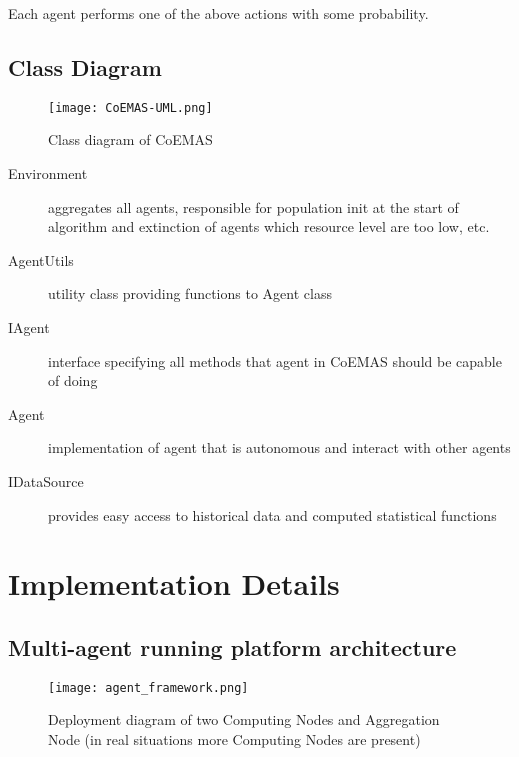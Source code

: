 Each agent performs one of the above actions with some probability.



\subsection{Class Diagram}
\label{CoEMAS-class-diagram}

\begin{figure}[H]   
	    \begin{center}
	      \texttt{[image: CoEMAS-UML.png]}
	    \end{center}
	    \caption{Class diagram of CoEMAS} 
	  \end{figure}

\begin{description}
  \item [Environment]
      aggregates all agents, responsible for population init at the start of algorithm and extinction of agents which resource level are too low, etc.
  \item [AgentUtils]
      utility class providing functions to Agent class
  \item [IAgent]
      interface specifying all methods that agent in CoEMAS should be capable of doing
  \item [Agent]
      implementation of agent that is autonomous and interact with other agents
  \item [IDataSource]
      provides easy access to historical data and computed statistical functions
 
\end{description}



\section{Implementation Details}
\label{sec:implDetails}


\subsection{Multi-agent running platform architecture}
\label{multi-agent}

\begin{figure}[H]
  \begin{center}
    \texttt{[image: agent\_framework.png]}
  \end{center}
  \caption{Deployment diagram of two Computing Nodes and Aggregation Node (in real situations more Computing Nodes are present)}
\end{figure}

